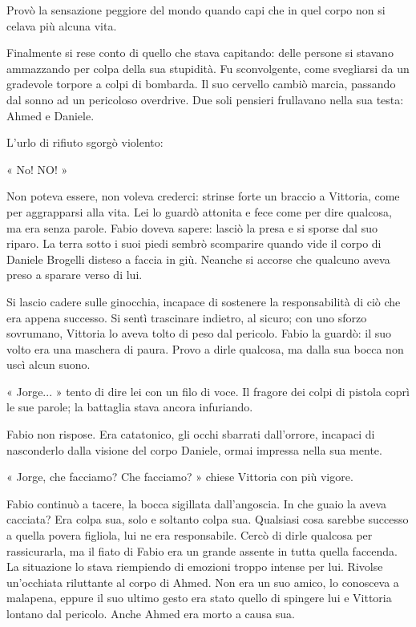 Provò la sensazione peggiore del mondo quando capi che in quel corpo non si celava più alcuna vita.

Finalmente si rese conto di quello che stava capitando: delle persone si stavano ammazzando per colpa della sua stupidità. Fu sconvolgente, come svegliarsi da un gradevole torpore a colpi di bombarda. Il suo cervello cambiò marcia, passando dal sonno ad un pericoloso overdrive. Due soli pensieri frullavano nella sua testa: Ahmed e Daniele.

L'urlo di rifiuto sgorgò violento:

« No! NO! »

Non poteva essere, non voleva crederci: strinse forte un braccio a Vittoria, come per aggrapparsi alla vita. Lei lo guardò attonita e fece come per dire qualcosa, ma era senza parole. Fabio doveva sapere: lasciò la presa e si sporse dal suo riparo. La terra sotto i suoi piedi sembrò scomparire quando vide il corpo di Daniele Brogelli disteso a faccia in giù. Neanche si accorse che qualcuno aveva preso a sparare verso di lui.

Si lascio cadere sulle ginocchia, incapace di sostenere la responsabilità di ciò che era appena successo. Si sentì trascinare indietro, al sicuro; con uno sforzo sovrumano, Vittoria lo aveva tolto di peso dal pericolo. Fabio la guardò: il suo volto era una maschera di paura. Provo a dirle qualcosa, ma dalla sua bocca non uscì alcun suono.

« Jorge... » tento di dire lei con un filo di voce. Il fragore dei colpi di pistola coprì le sue parole; la battaglia stava ancora infuriando.

Fabio non rispose. Era catatonico, gli occhi sbarrati dall'orrore, incapaci di nasconderlo dalla visione del corpo Daniele, ormai impressa nella sua mente.

« Jorge, che facciamo? Che facciamo? » chiese Vittoria con più vigore.

Fabio continuò a tacere, la bocca sigillata dall'angoscia. In che guaio la aveva cacciata? Era colpa sua, solo e soltanto colpa sua. Qualsiasi cosa sarebbe successo a quella povera figliola, lui ne era responsabile. Cercò di dirle qualcosa per rassicurarla, ma il fiato di Fabio era un grande assente in tutta quella faccenda. La situazione lo stava riempiendo di emozioni troppo intense per lui. Rivolse un'occhiata riluttante al corpo di Ahmed. Non era un suo amico, lo conosceva a malapena, eppure il suo ultimo gesto era stato quello di spingere lui e Vittoria lontano dal pericolo. Anche Ahmed era morto a causa sua.

